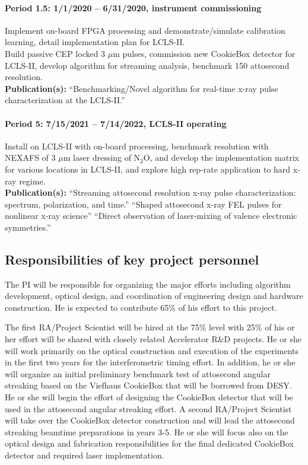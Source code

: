 \paragraph*{Period 1.5: 1/1/2020 -- 6/31/2020, instrument commissioning\\}
Implement on-board FPGA processing and demonstrate/simulate calibration learning, detail implementation plan for LCLS-II.\\
Build passive CEP locked 3 $\mu$m pulses, commission new CookieBox detector for LCLS-II, develop algorithm for streaming analysis, benchmark 150 attosecond resolution.\\
\textbf{Publication(s): }
``Benchmarking/Novel algorithm for real-time x-ray pulse characterization at the LCLS-II.''

\paragraph*{Period 5: 7/15/2021 -- 7/14/2022, LCLS-II operating\\}
Install on LCLS-II with on-board processing, benchmark resolution with NEXAFS of 3 $\mu$m laser dressing of N$_2$O, and develop the implementation matrix for various locations in LCLS-II, and explore high rep-rate application to hard x-ray regime.\\
\textbf{Publication(s): }
``Streaming attosecond resolution x-ray pulse characterization: spectrum, polarization, and time.''
``Shaped attosecond x-ray FEL pulses for nonlinear x-ray science''
``Direct observation of laser-mixing of valence electronic symmetries.''




\subsection*{Responsibilities of key project personnel}

The PI will be responsible for organizing the major efforts including algorithm development, optical design, and coordination of engineering design and hardware construction.
He is expected to contribute 65\% of his effort to this project.

The first RA/Project Scientist will be hired at the 75\% level with 25\% of his or her effort will be shared with closely related Accelerator R\&D projects.
He or she will work primarily on the optical construction and execution of the experiments in the first two years for the interferometric timing effort.
In addition, he or she will organize an initial preliminary benchmark test of attosecond angular streaking based on the Viefhaus CookieBox that will be borrowed from DESY.
He or she will begin the effort of designing the CookieBox detector that will be used in the attosecond angular streaking effort.
A second RA/Project Scientist will take over the CookieBox detector construction and will lead the attosecond streaking beamtime preparations in years 3-5.
He or she will focus also on the optical design and fabrication responsibilities for the final dedicated CookieBox detector and required laser implementation.

